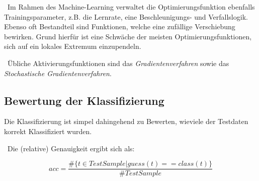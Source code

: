 ~\newline Im Rahmen des Machine-Learning verwaltet die Optimierungsfunktion ebenfalls Trainingsparameter, z.B. die Lernrate, eine Beschleunigungs- und Verfallslogik. Ebenso oft Bestandteil sind Funktionen, welche eine zufällige Verschiebung bewirken. Grund hierfür ist eine Schwäche der meisten Optimierungsfunktionen, sich auf ein lokales Extremum einzupendeln.

~\newline Übliche Aktivierungsfunktionen sind das \textit{Gradientenverfahren} sowie das \textit{Stochastische Gradientenverfahren}. 
\subsection{Bewertung der Klassifizierung}
Die Klassifizierung ist simpel dahingehend zu Bewerten, wieviele der Testdaten korrekt Klassifiziert wurden. 

~\newline Die (relative) Genauigkeit ergibt sich als: 

\begin{equation}
	acc = \dfrac{\#\{t \in  TestSample | guess(t)==class(t)\}}{\#TestSample}
\end{equation}